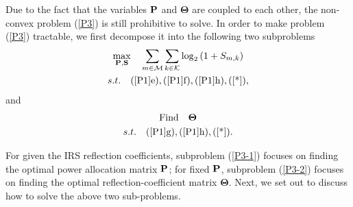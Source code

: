 \documentclass[journal]{IEEEtran}
\begin{document}
\noindent Due to the fact that the variables $ \bf{P} $ and $ \bm{\Theta} $ are coupled to each other, the non-convex problem (\ref{P3}) is still prohibitive to solve. In order to make problem (\ref{P3}) tractable, we first decompose it into the following two subproblems
\begin{subequations}\label{P3-1}
	\begin{gather}
	\mathop {\max }\limits_{{\bf{P}},{\bf{S}}} \quad \sum\limits_{m \in {\cal M}} {\sum\limits_{k \in {\cal K}} {{{\log }_2}\left( {1 + {S_{m,k}}} \right)} } \\
	s.t. \quad (\ref{P1}\rm{e}),(\ref{P1}\rm{f}),(\ref{P1}\rm{h}),(\ref{*}),
	\end{gather}
\end{subequations}
and
\begin{subequations}\label{P3-2}
	\begin{gather}
	{\rm{Find}}\quad{\bf{\Theta }}\\
	s.t. \quad (\ref{P1}\rm{g}),(\ref{P1}\rm{h}),(\ref{*}).
	\end{gather}
\end{subequations}

\noindent For given the IRS reflection coefficients, subproblem (\ref{P3-1}) focuses on finding the optimal power allocation matrix $ \bf{P} $; for fixed $ \bf{P} $, subproblem (\ref{P3-2}) focuses on finding the optimal reflection-coefficient matrix $ \bm{\Theta} $. Next, we set out to discuss how to solve the above two sub-problems.
\end{document}
